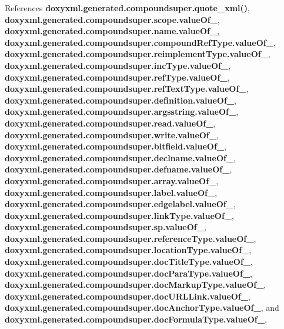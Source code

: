 References {\bf doxyxml.\+generated.\+compoundsuper.\+quote\+\_\+xml()}, {\bf doxyxml.\+generated.\+compoundsuper.\+scope.\+value\+Of\+\_\+}, {\bf doxyxml.\+generated.\+compoundsuper.\+name.\+value\+Of\+\_\+}, {\bf doxyxml.\+generated.\+compoundsuper.\+compound\+Ref\+Type.\+value\+Of\+\_\+}, {\bf doxyxml.\+generated.\+compoundsuper.\+reimplement\+Type.\+value\+Of\+\_\+}, {\bf doxyxml.\+generated.\+compoundsuper.\+inc\+Type.\+value\+Of\+\_\+}, {\bf doxyxml.\+generated.\+compoundsuper.\+ref\+Type.\+value\+Of\+\_\+}, {\bf doxyxml.\+generated.\+compoundsuper.\+ref\+Text\+Type.\+value\+Of\+\_\+}, {\bf doxyxml.\+generated.\+compoundsuper.\+definition.\+value\+Of\+\_\+}, {\bf doxyxml.\+generated.\+compoundsuper.\+argsstring.\+value\+Of\+\_\+}, {\bf doxyxml.\+generated.\+compoundsuper.\+read.\+value\+Of\+\_\+}, {\bf doxyxml.\+generated.\+compoundsuper.\+write.\+value\+Of\+\_\+}, {\bf doxyxml.\+generated.\+compoundsuper.\+bitfield.\+value\+Of\+\_\+}, {\bf doxyxml.\+generated.\+compoundsuper.\+declname.\+value\+Of\+\_\+}, {\bf doxyxml.\+generated.\+compoundsuper.\+defname.\+value\+Of\+\_\+}, {\bf doxyxml.\+generated.\+compoundsuper.\+array.\+value\+Of\+\_\+}, {\bf doxyxml.\+generated.\+compoundsuper.\+label.\+value\+Of\+\_\+}, {\bf doxyxml.\+generated.\+compoundsuper.\+edgelabel.\+value\+Of\+\_\+}, {\bf doxyxml.\+generated.\+compoundsuper.\+link\+Type.\+value\+Of\+\_\+}, {\bf doxyxml.\+generated.\+compoundsuper.\+sp.\+value\+Of\+\_\+}, {\bf doxyxml.\+generated.\+compoundsuper.\+reference\+Type.\+value\+Of\+\_\+}, {\bf doxyxml.\+generated.\+compoundsuper.\+location\+Type.\+value\+Of\+\_\+}, {\bf doxyxml.\+generated.\+compoundsuper.\+doc\+Title\+Type.\+value\+Of\+\_\+}, {\bf doxyxml.\+generated.\+compoundsuper.\+doc\+Para\+Type.\+value\+Of\+\_\+}, {\bf doxyxml.\+generated.\+compoundsuper.\+doc\+Markup\+Type.\+value\+Of\+\_\+}, {\bf doxyxml.\+generated.\+compoundsuper.\+doc\+U\+R\+L\+Link.\+value\+Of\+\_\+}, {\bf doxyxml.\+generated.\+compoundsuper.\+doc\+Anchor\+Type.\+value\+Of\+\_\+}, and {\bf doxyxml.\+generated.\+compoundsuper.\+doc\+Formula\+Type.\+value\+Of\+\_\+}.



